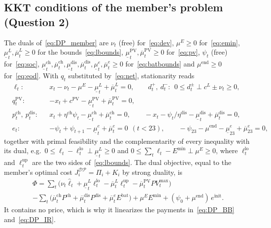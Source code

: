 \subsection*{KKT conditions of the member's problem (Question 2)}\label{app:kkt_member}
The duals of~\eqref{eq:DP_member} are $\nu_t$ (free) for~\eqref{eq:dev}, $\mu^E\geq0$ for~\eqref{eq:emin}, $\underline{\mu}^L_t,\overline{\mu}^L_t\geq0$ for the bounds~\eqref{eq:lbounds}, $\underline{\mu}^{\mathrm{PV}}_t,\overline{\mu}^{\mathrm{PV}}_t\geq0$ for~\eqref{eq:pv}, $\psi_t$ (free) for~\eqref{eq:soc}, $\underline{\mu}^{\mathrm{ch}}_t,\overline{\mu}^{\mathrm{ch}}_t,\underline{\mu}^{\mathrm{dis}}_t,\overline{\mu}^{\mathrm{dis}}_t,\underline{\mu}^{e}_t,\overline{\mu}^{e}_t\geq0$ for~\eqref{eq:batbounds} and $\mu^{\mathrm{end}}\geq0$ for~\eqref{eq:eod}.
With $q_t$ substituted by~\eqref{eq:net}, stationarity reads
\begin{align*}
&\ell_t: && x_t-\nu_t-\mu^E-\underline{\mu}^L_t+\overline{\mu}^L_t=0, \qquad
d^{+}_t,\ d^{-}_t:\ \ 0\leq d^{\pm}_t\perp c^L\pm\nu_t\geq0,\\
&q^{\mathrm{PV}}_t: && -x_t+c^{\mathrm{PV}}-\underline{\mu}^{\mathrm{PV}}_t+\overline{\mu}^{\mathrm{PV}}_t=0,\\
&p^{\mathrm{ch}}_t,\ p^{\mathrm{dis}}_t: && x_t+\eta^{\mathrm{ch}}\psi_t-\underline{\mu}^{\mathrm{ch}}_t+\overline{\mu}^{\mathrm{ch}}_t=0, \qquad
-x_t-\psi_t/\eta^{\mathrm{dis}}-\underline{\mu}^{\mathrm{dis}}_t+\overline{\mu}^{\mathrm{dis}}_t=0,\\
&e_t: && -\psi_t+\psi_{t+1}-\underline{\mu}^{e}_t+\overline{\mu}^{e}_t=0\ \ (t<23), \qquad -\psi_{23}-\mu^{\mathrm{end}}-\underline{\mu}^{e}_{23}+\overline{\mu}^{e}_{23}=0,
\end{align*}
together with primal feasibility and the complementarity of every inequality with its dual, e.g.\ $0\leq\ell_t-\ell^{\mathrm{lo}}_t\perp\underline{\mu}^L_t\geq0$ and $0\leq\sum_t\ell_t-E^{\min}\perp\mu^E\geq0$, where $\ell^{\mathrm{lo}}_t$ and $\ell^{\mathrm{up}}_t$ are the two sides of~\eqref{eq:lbounds}.
The dual objective, equal to the member's optimal cost $J^{\mathcal{DP}}_i=\Pi_i+K_i$ by strong duality, is
\begin{multline*}
\Phi=\sum_t\Big(\nu_t\hat{\ell}_t+\underline{\mu}^L_t\ell^{\mathrm{lo}}_t-\overline{\mu}^L_t\ell^{\mathrm{up}}_t-\overline{\mu}^{\mathrm{PV}}_tPV^{\max}_t\Big)\\
-\sum_t\Big(\overline{\mu}^{\mathrm{ch}}_tP^{\mathrm{ch}}+\overline{\mu}^{\mathrm{dis}}_tP^{\mathrm{dis}}+\overline{\mu}^{e}_tE^{\mathrm{bat}}\Big)+\mu^EE^{\min}+(\psi_0+\mu^{\mathrm{end}})\,e^{\mathrm{init}} .
\end{multline*}
It contains no price, which is why it linearizes the payments in~\eqref{eq:DP_BB} and~\eqref{eq:DP_IR}.


